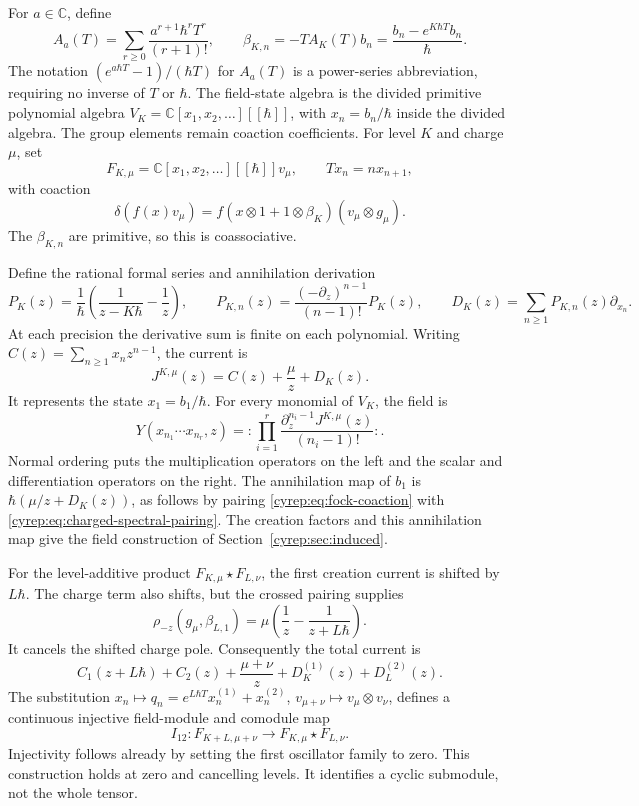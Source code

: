 For \(a\in\mathbb C\), define
\begin{equation}\label{cyrep:eq:fock-A}
 A_a(T)=\sum_{r\geq0}\frac{a^{r+1}\hbar^rT^r}{(r+1)!},
 \qquad \beta_{K,n}=-TA_K(T)b_n
                    =\frac{b_n-e^{K\hbar T}b_n}{\hbar}.
\end{equation}
The notation \((e^{a\hbar T}-1)/(\hbar T)\) for \(A_a(T)\)
is a power-series abbreviation, requiring no inverse of \(T\)
or \(\hbar\).
The field-state algebra is the divided primitive polynomial algebra
\(V_K=\mathbb C[x_1,x_2,\ldots][[\hbar]]\), with
\(x_n=b_n/\hbar\) inside the divided algebra. The group elements
remain coaction coefficients. For level \(K\) and charge
\(\mu\), set
\[
 F_{K,\mu}=\mathbb C[x_1,x_2,\ldots][[\hbar]]v_\mu,
 \qquad Tx_n=nx_{n+1},
\]
with coaction
\begin{equation}\label{cyrep:eq:fock-coaction}
 \delta(f(x)v_\mu)=
 f(x\otimes1+1\otimes\beta_K)(v_\mu\otimes g_\mu).
\end{equation}
The \(\beta_{K,n}\) are primitive, so this is coassociative.

Define the rational formal series and annihilation derivation
\[
 P_K(z)=\frac1\hbar\left(\frac1{z-K\hbar}-\frac1z\right),\qquad
 P_{K,n}(z)=\frac{(-\partial_z)^{n-1}}{(n-1)!}P_K(z),\qquad
 D_K(z)=\sum_{n\geq1}P_{K,n}(z)\partial_{x_n}.
\]
At each precision the derivative sum is finite on each polynomial.
Writing \(C(z)=\sum_{n\geq1}x_nz^{n-1}\), the current is
\begin{equation}\label{cyrep:eq:fock-current}
 J^{K,\mu}(z)=C(z)+\frac\mu z+D_K(z).
\end{equation}
It represents the state \(x_1=b_1/\hbar\). For every monomial of
\(V_K\), the field is
\[
 Y(x_{n_1}\cdots x_{n_r},z)
 =:\prod_{i=1}^r\frac{\partial_z^{n_i-1}J^{K,\mu}(z)}{(n_i-1)!}: .
\]
Normal ordering puts the multiplication operators on the left
and the scalar and differentiation operators on the right.
The annihilation map of \(b_1\) is
\(\hbar(\mu/z+D_K(z))\), as follows by pairing
\eqref{cyrep:eq:fock-coaction} with \eqref{cyrep:eq:charged-spectral-pairing}.
The creation factors and this annihilation map give the field
construction of Section~\ref{cyrep:sec:induced}.

For the level-additive product \(F_{K,\mu}\star F_{L,\nu}\), the
first creation current is shifted by \(L\hbar\). The charge term
also shifts, but the crossed pairing supplies
\[
 \rho_{-z}(g_\mu,\beta_{L,1})
          =\mu\left(\frac1z-\frac1{z+L\hbar}\right).
\]
It cancels the shifted charge pole. Consequently the total current is
\begin{equation}\label{cyrep:eq:fock-total}
 C_1(z+L\hbar)+C_2(z)+\frac{\mu+\nu}{z}+D_K^{(1)}(z)+D_L^{(2)}(z).
\end{equation}
The substitution
\(x_n\mapsto q_n=e^{L\hbar T}x_n^{(1)}+x_n^{(2)}\),
\(v_{\mu+\nu}\mapsto v_\mu\otimes v_\nu\), defines a continuous
injective field-module and comodule map
\[
 I_{12}:F_{K+L,\mu+\nu}\longrightarrow F_{K,\mu}\star F_{L,\nu}.
\]
Injectivity follows already by setting the first oscillator family
to zero. This construction holds at zero and cancelling levels.
It identifies a cyclic submodule, not the whole tensor.

